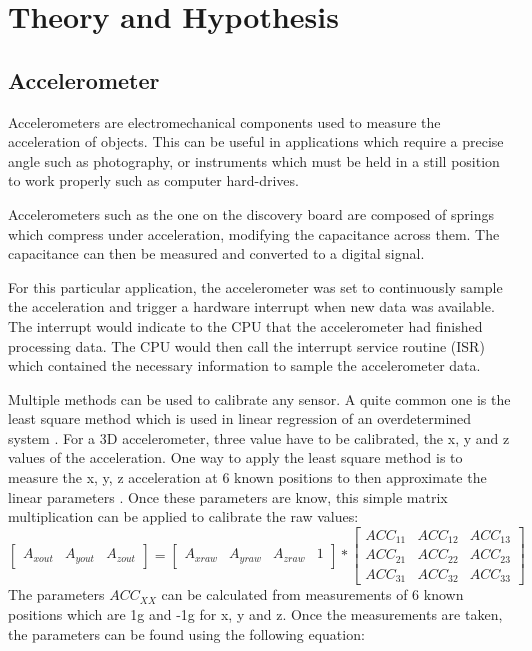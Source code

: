 \documentclass[12pt]{article}
\begin{document}
\section{Theory and Hypothesis}
\subsection{Accelerometer}
Accelerometers are electromechanical components used to measure the acceleration of objects. This can be useful in applications which require a precise angle such as photography, or instruments which must be held in a still position to work properly such as computer hard-drives.

Accelerometers such as the one on the discovery board are composed of springs which compress under acceleration, modifying the capacitance across them. The capacitance can then be measured and converted to a digital signal. \cite{AN3182ApplicationNote}


For this particular application, the accelerometer was set to continuously sample the acceleration and trigger a hardware interrupt when new data was available. The interrupt would indicate to the CPU that the accelerometer had finished processing data. The CPU would then call the interrupt service routine (ISR) which contained the necessary information to sample the accelerometer data.



Multiple methods can be used to calibrate any sensor. A quite common one is the least square method which is used in linear regression of an overdetermined system \cite{bjorck1996numerical}. For a 3D accelerometer, three value have to be calibrated, the x, y and z values of the acceleration. One way to apply the least square method is to measure the x, y, z acceleration at 6 known positions to then approximate the linear parameters \cite{AN3182ApplicationNote}. Once these parameters are know, this simple matrix multiplication can be applied to calibrate the raw values:
\begin{equation} \label{cal_eq:1}
 \begin{bmatrix}A_{xout} & A_{yout} & A_{zout}\end{bmatrix} = \begin{bmatrix}A_{xraw} & A_{yraw} & A_{zraw} & 1\end{bmatrix} *
\begin{bmatrix}ACC_{11} & ACC_{12} & ACC_{13} \\
ACC_{21} & ACC_{22} & ACC_{23} \\
ACC_{31} & ACC_{32} & ACC_{33} \end{bmatrix}
\end{equation}
The parameters $ ACC_{XX} $ can be calculated from measurements of 6 known positions which are 1g and -1g for x, y and z. Once the measurements are taken, the parameters can be found using the following equation:
\end{document}
